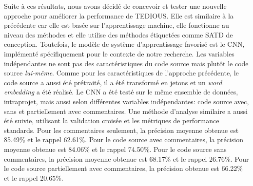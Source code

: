 Suite \`{a} ces r\'{e}sultats, nous avons d\'{e}cid\'{e} de concevoir et tester une nouvelle approche pour am\'{e}liorer la performance de \ac{TEDIOUS}. Elle est similaire \`{a} la pr\'{e}c\'{e}dente car elle est bas\'{e}e sur l'apprentissage machine, elle fonctionne au niveau des m\'{e}thodes et elle utilise des m\'{e}thodes \'{e}tiquet\'{e}es comme \ac{SATD} de conception. Toutefois, le mod\`{e}le de syst\`{e}me d'apprentissage favoris\'{e} est le \ac{CNN}, impl\'{e}ment\'{e} sp\'{e}cifiquement pour le contexte de notre recherche. Les variables ind\'{e}pendantes ne sont pas des caract\'{e}ristiques du code source mais plut\^{o}t le code source \emph{lui-m\^{e}me}. Comme pour les caract\'{e}ristiques de l'approche pr\'{e}c\'{e}dente, le code source a aussi \'{e}t\'{e} pr\'{e}trait\'{e}, il a \'{e}t\'{e} transform\'{e} en jetons et un \emph{word embedding} a \'{e}t\'{e} r\'{e}alis\'{e}. Le \ac{CNN} a \'{e}t\'{e} test\'{e} sur le m\^{e}me ensemble de donn\'{e}es, intraprojet, mais aussi selon diff\'{e}rentes variables ind\'{e}pendantes: code source avec, sans et partiellement avec commentaires. Une m\'{e}thode d'analyse similaire a aussi \'{e}t\'{e} suivie, utilisant la validation crois\'{e}e et les m\'{e}triques de performance standards. Pour les commentaires seulement, la pr\'{e}cision moyenne obtenue est 85.49\% et le rappel 62.61\%. Pour le code source avec commentaires, la pr\'{e}cision moyenne obtenue est 84.06\% et le rappel 74.50\%. Pour le code source sans commentaires, la pr\'{e}cision moyenne obtenue est 68.17\% et le rappel 26.76\%. Pour le code source partiellement avec commentaires, la pr\'{e}cision obtenue est 66.22\% et le rappel 20.65\%.


